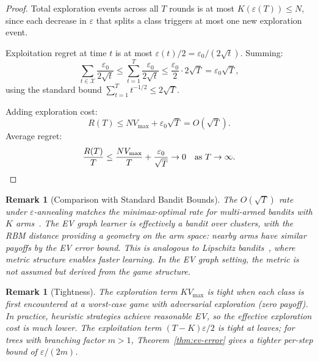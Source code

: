\documentclass[11pt]{article}
\newtheorem{remark}[theorem]{Remark}
\newcommand{\calX}{\mathcal{X}}
\begin{document}
\begin{proof}
Total exploration events across all $T$ rounds is at most
$K(\varepsilon(T)) \le N$, since each decrease in $\varepsilon$ that
splits a class triggers at most one new exploration event.

Exploitation regret at time $t$ is at most $\varepsilon(t)/2 =
\varepsilon_0/(2\sqrt{t})$. Summing:
\[
  \sum_{t \in \calX} \frac{\varepsilon_0}{2\sqrt{t}} \le
  \sum_{t=1}^T \frac{\varepsilon_0}{2\sqrt{t}} \le
  \frac{\varepsilon_0}{2} \cdot 2\sqrt{T} = \varepsilon_0\sqrt{T},
\]
using the standard bound $\sum_{t=1}^T t^{-1/2} \le 2\sqrt{T}$.

Adding exploration cost:
\[
  R(T) \le N V_{\max} + \varepsilon_0\sqrt{T} = O(\sqrt{T}).
\]
Average regret:
\[
  \frac{R(T)}{T} \le \frac{N V_{\max}}{T} +
  \frac{\varepsilon_0}{\sqrt{T}} \to 0 \quad\text{as } T \to \infty.
  \qedhere
\]
\end{proof}

\begin{remark}[Comparison with Standard Bandit Bounds]
The $O(\sqrt{T})$ rate under $\varepsilon$-annealing matches the
minimax-optimal rate for multi-armed bandits with $K$
arms~\citep{auer2002finite}. The EV graph learner is effectively a
bandit over clusters, with the RBM distance providing a geometry on the
arm space: nearby arms have similar payoffs by the EV error bound. This
is analogous to Lipschitz bandits~\citep{kleinberg2005nearly}, where
metric structure enables faster learning. In the EV graph setting, the
metric is not assumed but derived from the game structure.
\end{remark}

\begin{remark}[Tightness]
The exploration term $K V_{\max}$ is tight when each class is first
encountered at a worst-case game with adversarial exploration (zero
payoff). In practice, heuristic strategies achieve reasonable EV, so
the effective exploration cost is much lower. The exploitation term
$(T-K)\varepsilon/2$ is tight at leaves; for trees with branching
factor $m > 1$, Theorem~\ref{thm:ev-error} gives a tighter per-step
bound of $\varepsilon/(2m)$.
\end{remark}
\end{document}
